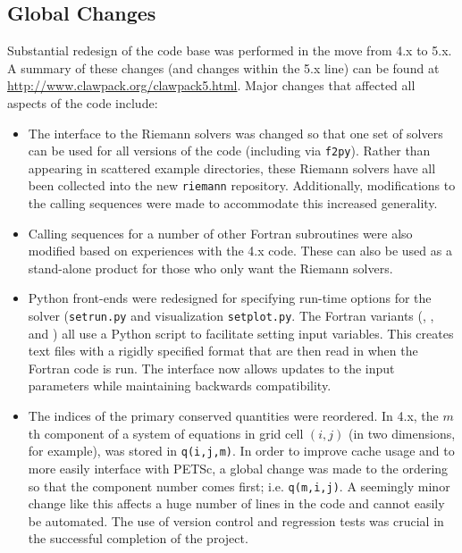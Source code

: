 %
%
%

\subsection{Global Changes}
Substantial redesign of the \clawpack code base was performed in the move
from \clawpack 4.x to 5.x.  A summary of these changes (and changes within
the 5.x line) can be found at \url{http://www.clawpack.org/clawpack5.html}.
Major changes that affected all aspects of the code include:
\begin{itemize}
    \item The interface to the \clawpack Riemann solvers was changed so that one set
of solvers can be used for all versions of the code (including \pyclaw
    via \texttt{f2py}).  Rather than appearing in scattered example directories,
    these Riemann solvers have all been collected into the new
    \texttt{riemann} repository. Additionally, modifications to the
calling sequences were made to accommodate this increased generality.
\item Calling
    sequences for a number of other Fortran subroutines were also modified based
    on experiences with the \clawpack 4.x code.  These can also be used as a
    stand-alone product for those who only want the Riemann solvers.
    \item Python front-ends were redesigned for specifying run-time options for
    the solver (\texttt{setrun.py} and visualization \texttt{setplot.py}.  The
    Fortran variants (\classic, \amrclaw, and \geoclaw) all use a Python script
    to facilitate setting input variables.  This creates text files with a
    rigidly specified format that are then read in when the Fortran code is run.
    The interface now allows updates to the input parameters while maintaining
    backwards compatibility.
    \item The indices of the primary conserved quantities were reordered.  In
    \clawpack 4.x, the $m$th component of a
    system of equations in grid cell $(i,j)$ (in two dimensions, for example),
    was stored in \texttt{q(i,j,m)}.  In order to improve cache usage and to
    more easily interface with PETSc, a global
    change was made to the ordering so that the component number comes
    first; i.e. \texttt{q(m,i,j)}.  A seemingly minor change like this affects a
    huge number of lines in the code and cannot easily be automated. The use of
    version control and regression tests was crucial in the successful
    completion of the project.
\end{itemize}
